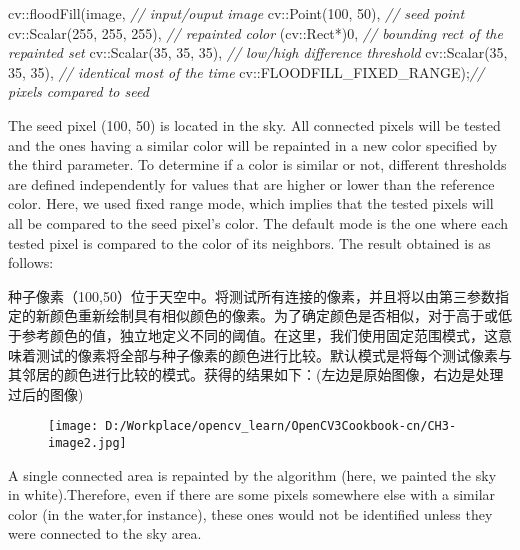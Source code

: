 \documentclass[]{article}
\newenvironment{Shaded}{}{}
\newcommand{\CommentTok}[1]{\textcolor[rgb]{0.38,0.63,0.69}{\textit{#1}}}
\newcommand{\DecValTok}[1]{\textcolor[rgb]{0.25,0.63,0.44}{#1}}
\newcommand{\NormalTok}[1]{#1}
\begin{document}
\begin{Shaded}
\begin{Highlighting}[]
\NormalTok{cv::floodFill(image, }\CommentTok{// input/ouput image}
\NormalTok{              cv::Point(}\DecValTok{100}\NormalTok{, }\DecValTok{50}\NormalTok{), }\CommentTok{// seed point}
\NormalTok{              cv::Scalar(}\DecValTok{255}\NormalTok{, }\DecValTok{255}\NormalTok{, }\DecValTok{255}\NormalTok{), }\CommentTok{// repainted color}
\NormalTok{              (cv::Rect*)}\DecValTok{0}\NormalTok{, }\CommentTok{// bounding rect of the repainted set}
\NormalTok{              cv::Scalar(}\DecValTok{35}\NormalTok{, }\DecValTok{35}\NormalTok{, }\DecValTok{35}\NormalTok{), }\CommentTok{// low/high difference threshold}
\NormalTok{              cv::Scalar(}\DecValTok{35}\NormalTok{, }\DecValTok{35}\NormalTok{, }\DecValTok{35}\NormalTok{), }\CommentTok{// identical most of the time}
\NormalTok{              cv::FLOODFILL_FIXED_RANGE);}\CommentTok{// pixels compared to seed}
\end{Highlighting}
\end{Shaded}

The seed pixel (100, 50) is located in the sky. All connected pixels
will be tested and the ones having a similar color will be repainted in
a new color specified by the third parameter. To determine if a color is
similar or not, different thresholds are defined independently for
values that are higher or lower than the reference color. Here, we used
fixed range mode, which implies that the tested pixels will all be
compared to the seed pixel's color. The default mode is the one where
each tested pixel is compared to the color of its neighbors. The result
obtained is as follows:

种子像素（100,50）位于天空中。将测试所有连接的像素，并且将以由第三参数指定的新颜色重新绘制具有相似颜色的像素。为了确定颜色是否相似，对于高于或低于参考颜色的值，独立地定义不同的阈值。在这里，我们使用固定范围模式，这意味着测试的像素将全部与种子像素的颜色进行比较。默认模式是将每个测试像素与其邻居的颜色进行比较的模式。获得的结果如下：(左边是原始图像，右边是处理过后的图像)

\begin{figure}
\centering
\texttt{[image: D:/Workplace/opencv\_learn/OpenCV3Cookbook-cn/CH3-image2.jpg]}
\caption{}
\end{figure}

A single connected area is repainted by the algorithm (here, we painted
the sky in white).Therefore, even if there are some pixels somewhere
else with a similar color (in the water,for instance), these ones would
not be identified unless they were connected to the sky area.
\end{document}
